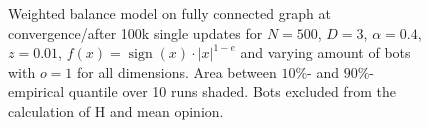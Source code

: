\documentclass[11pt]{article}
\DeclareMathOperator{\sign}{sign}
\begin{document}
\begin{figure}[!htb]
\begin{center}
\end{center}
\caption{Weighted balance model on fully connected graph at convergence/after 100k single updates for $N=500$, $D=3$, $\alpha=0.4$, $z=0.01$, $f(x)=\sign(x)\cdot|x|^{1-e}$ and varying amount of bots with $o=1$ for all dimensions. Area between $10\%$- and $90\%$- empirical quantile over 10 runs shaded. Bots excluded from the calculation of H and mean opinion. 
}
\label{bots_shifted}
\end{figure}
\end{document}
